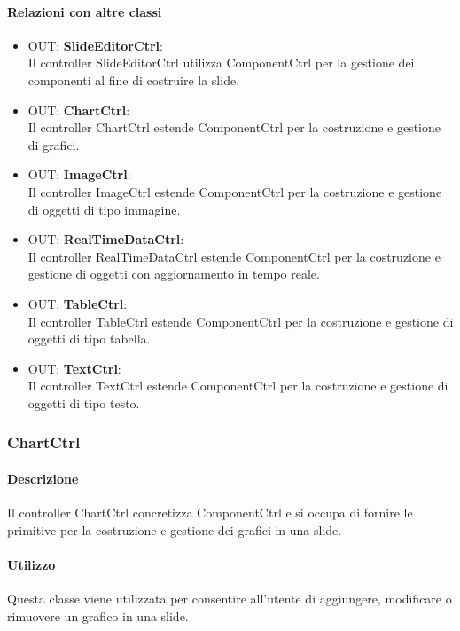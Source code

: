 	\paragraph{Relazioni con altre classi}
	\begin{itemize}
	 \item OUT: \textbf{SlideEditorCtrl}:\\
		Il controller SlideEditorCtrl utilizza ComponentCtrl per la gestione dei componenti al fine di costruire la slide.
	 \item OUT: \textbf{ChartCtrl}:\\
	 	Il controller ChartCtrl estende ComponentCtrl per la costruzione e gestione di grafici.
	 \item OUT: \textbf{ImageCtrl}:\\
		Il controller ImageCtrl estende ComponentCtrl per la costruzione e gestione di oggetti di tipo immagine.
	 \item OUT: \textbf{RealTimeDataCtrl}:\\
		Il controller RealTimeDataCtrl estende ComponentCtrl per la costruzione e gestione di oggetti con aggiornamento in tempo reale.
	 \item OUT: \textbf{TableCtrl}:\\
		Il controller TableCtrl estende ComponentCtrl per la costruzione e gestione di oggetti di tipo tabella.
	 \item OUT: \textbf{TextCtrl}:\\
		Il controller TextCtrl estende ComponentCtrl per la costruzione e gestione di oggetti di tipo testo.
	
	\end{itemize}
	
\newpage
\subsubsection{ChartCtrl}
   \paragraph{Descrizione}
	Il controller ChartCtrl concretizza ComponentCtrl e si occupa di fornire le primitive per la costruzione e gestione dei grafici in una slide.
		
	\paragraph{Utilizzo}
	Questa classe viene utilizzata per consentire all'utente di aggiungere, modificare o rimuovere un grafico in una slide.
	
